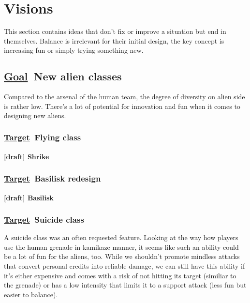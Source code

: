 \documentclass{scrartcl}
\newcommand{\goal}     [0]{\textbf{\underline{Goal}\ }}
\newcommand{\target}   [0]{\textbf{\underline{Target}\ }}
\newcommand{\draft}    [0]{\textcolor{draft}    {\textbf{[draft] }}}
\begin{document}
\section{Visions}

This section contains ideas that don't fix or improve a situation but end in themselves. Balance is irrelevant for their initial design, the key concept is increasing fun or simply trying something new.

\subsection{\goal New alien classes}

Compared to the arsenal of the human team, the degree of diversity on alien side is rather low. There's a lot of potential for innovation and fun when it comes to designing new aliens.

\subsubsection{\target Flying class}

\paragraph{\draft Shrike}
\label{vulture}

\subsubsection{\target Basilisk redesign}

\paragraph{\draft Basilisk}
\label{paralisk}

\subsubsection{\target Suicide class}
\label{suicide-class}

A suicide class was an often requested feature. Looking at the way how players use the human grenade in kamikaze manner, it seems like such an ability could be a lot of fun for the aliens, too. While we shouldn't promote mindless attacks that convert personal credits into reliable damage, we can still have this ability if it's either expensive and comes with a risk of not hitting its target (similiar to the grenade) or has a low intensity that limits it to a support attack (less fun but easier to balance).
\end{document}
